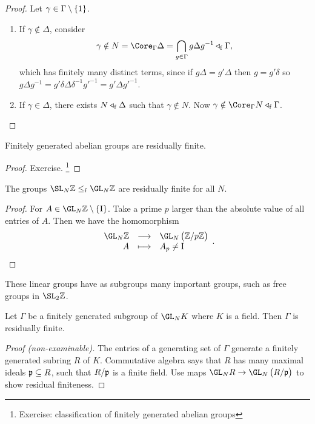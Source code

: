 \begin{proof}
Let $ \gamma \in \Gamma \setminus \cbr{1} $.
\begin{enumerate}[leftmargin=0.5in, label=Case \arabic*.]
\item If $ \gamma \notin \Delta $, consider
$$ \gamma \notin N = \Core_\Gamma \Delta = \bigcap_{g \in \Gamma} g\Delta g^{-1} \triangleleft_\f \Gamma, $$
which has finitely many distinct terms, since if $ g\Delta = g'\Delta $ then $ g = g'\delta $ so $ g\Delta g^{-1} = g'\delta\Delta\delta^{-1}g'^{-1} = g'\Delta g'^{-1} $.
\item If $ \gamma \in \Delta $, there exists $ N \triangleleft_{\mathrm{f}} \Delta $ such that $ \gamma \notin N $. Now $ \gamma \notin \Core_\Gamma N \triangleleft_\f \Gamma $.
\end{enumerate}
\end{proof}

\begin{proposition}
Finitely generated abelian groups are residually finite.
\end{proposition}

\begin{proof}
Exercise. \footnote{Exercise: classification of finitely generated abelian groups}
\end{proof}

\begin{proposition}
The groups $ \SL_N \ZZ \le_\f \GL_N \ZZ $ are residually finite for all $ N $.
\end{proposition}

\begin{proof}
For $ A \in \GL_N \ZZ \setminus \cbr{\I} $. Take a prime $ p $ larger than the absolute value of all entries of $ A $. Then we have the homomorphism
$$ \function{\GL_N \ZZ}{\GL_N \br{\ZZ / p\ZZ}}{A}{A_p \ne \I}. $$
\end{proof}

These linear groups have as subgroups many important groups, such as free groups in $ \SL_2 \ZZ $.

\begin{theorem}
Let $ \Gamma $ be a finitely generated subgroup of $ \GL_N K $ where $ K $ is a field. Then $ \Gamma $ is residually finite.
\end{theorem}

\begin{proof}[Proof (non-examinable)]
The entries of a generating set of $ \Gamma $ generate a finitely generated subring $ R $ of $ K $. Commutative algebra says that $ R $ has many maximal ideals $ \mathfrak{p} \subseteq R $, such that $ R / \mathfrak{p} $ is a finite field. Use maps $ \GL_N R \to \GL_N \br{R / \ppp} $ to show residual finiteness.
\end{proof}

